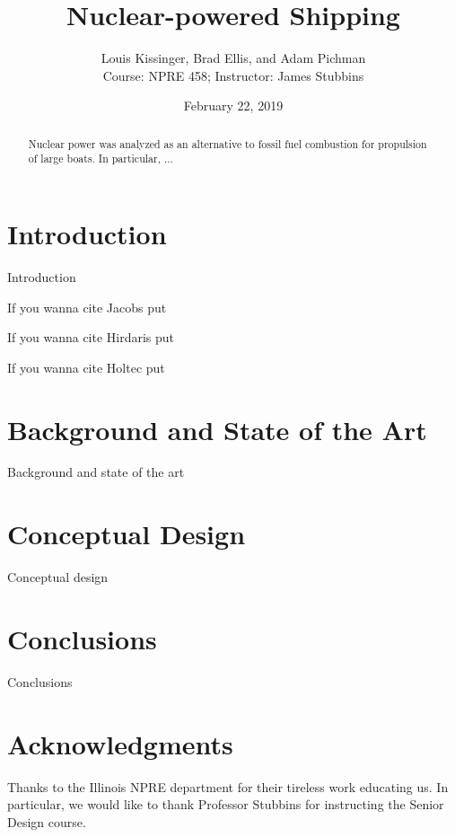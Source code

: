 \documentclass[12pt]{article}
\title{Nuclear-powered Shipping}
\author{Louis Kissinger, Brad Ellis, and Adam Pichman \\Course: NPRE 458; Instructor: James Stubbins}
\date{February 22, 2019}
\begin{document}
\maketitle
%
\pagebreak
\begin{abstract}
Nuclear power was analyzed as an alternative to fossil fuel combustion for propulsion of large boats. In particular, ... 
\end{abstract} 

\pagebreak
\tableofcontents


\section{Introduction}
Introduction

If you wanna cite Jacobs put \cite{Jacobs}

If you wanna cite Hirdaris put \cite{Hirdaris}

If you wanna cite Holtec put \cite{Holtec}

\section{Background and State of the Art}
Background and state of the art
\section{Conceptual Design}
Conceptual design
\section{Conclusions}
Conclusions


\section{Acknowledgments}
Thanks to the Illinois NPRE department for their tireless work educating us. In particular, we would like to thank Professor Stubbins for instructing the Senior Design course.



\end{document}
